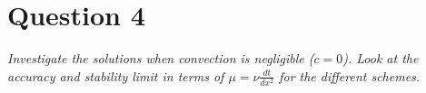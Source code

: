 \section*{Question 4}
\emph{Investigate the solutions when convection is negligible ($c = 0$). Look at the accuracy and stability limit in terms of $\mu = \nu \tfrac{dt}{dx^2}$ for the different schemes.}
